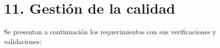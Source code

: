 \section{11. Gestión de la calidad}
\label{sec:calidad}


Se presentan a continuación los requerimientos con sus verificaciones y validaciones: